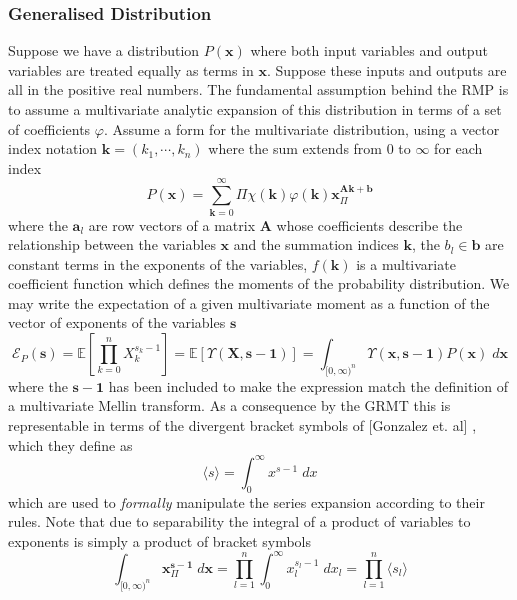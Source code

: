 \documentclass{article}
\begin{document}
\subsubsection{Generalised Distribution}
Suppose we have a distribution $P(\mathbf{x})$ where both input variables and output variables are treated equally as terms in $\mathbf{x}$. Suppose these inputs and outputs are all in the positive real numbers. The fundamental assumption behind the RMP is to assume a multivariate analytic expansion of this distribution in terms of a set of coefficients $\varphi$. Assume a form for the multivariate distribution, using a vector index notation $\mathbf{k} = (k_1, \cdots, k_n)$ where the sum extends from $0$ to $\infty$ for each index
\begin{equation}
P(\mathbf{x}) = \sum_{\mathbf{k}=0}^\infty  \Pi\chi(\mathbf{k})\varphi(\mathbf{k})\mathbf{x}^{\mathbf{A}\mathbf{k}+\mathbf{b}}_\Pi
\end{equation}
where the $\mathbf{a}_l$ are row vectors of a matrix $\mathbf{A}$ whose coefficients describe the relationship between the variables $\mathbf{x}$ and the summation indices $\mathbf{k}$, the $b_l \in \mathbf{b}$ are constant terms in the exponents of the variables, $f(\mathbf{k})$ is a multivariate coefficient function which defines the moments of the probability distribution. We may write the expectation of a given multivariate moment as a function of the vector of exponents of the variables $\mathbf{s}$
$$
\mathcal{E}_P(\mathbf{s}) = \mathbb{E}\left[\prod_{k=0}^n X_k^{s_k-1}\right] = \mathbb{E}\left[\Upsilon(\mathbf{X},\mathbf{s}-\mathbf{1})\right] =\int_{[0,\infty)^{n}} \Upsilon(\mathbf{x},\mathbf{s}-\mathbf{1}) P(\mathbf{x}) \; d \mathbf{x}
$$
where the $\mathbf{s}-\mathbf{1}$ has been included to make the expression match the definition of a multivariate Mellin transform. As a consequence by the GRMT this is representable in terms of the divergent bracket symbols of [Gonzalez et. al] \citep{Gonzalez2015}, which they define as
\begin{equation}
\langle s \rangle = \int_0^\infty x^{s-1} \; dx
\end{equation}
which are used to \emph{formally} manipulate the series expansion according to their rules. Note that due to separability the integral of a product of variables to exponents is simply a product of bracket symbols
\begin{equation}
\int_{[0,\infty)^n} \mathbf{x}^{\mathbf{s-1}}_\Pi\;d \mathbf{x} = \prod_{l=1}^n \int_0^\infty x_l^{s_l-1} \; dx_l = \prod_{l=1}^n \langle s_l \rangle
\label{eqn:bracket}
\end{equation} 
\end{document}

